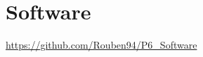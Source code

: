 \clearpage
\section{Software}\label{sec:Software}
\todo[inline]{}
\url{https://github.com/Rouben94/P6_Software}
